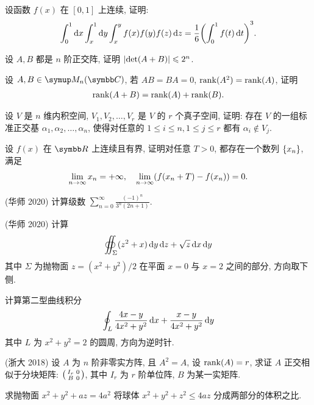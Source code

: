 \begin{exercise}[resume=exer]
      \item 设函数 $ f(x) $ 在 $ [0, 1] $ 上连续, 证明:
      \begin{align*}
          \int_{0}^{1} \dx*\int_{x}^{1} \dd{y}\int_{x}^{y}f(x)f(y)f(z)\dd{z} = \frac{1}{6}\qty(\int_{0}^{1}f(t) \dd{t})^{3}.
      \end{align*}
      \item 设 $ A, B $ 都是 $ n $ 阶正交阵, 证明 $ \abs{\det(A+B)} \leqslant 2^{n} $.
      \item 设 $ A, B \in \MM[\C] $, 若 $ AB = BA = 0 $, $ \rank(A^{2}) = \rank(A) $, 证明
      \begin{align*}
          \rank(A+B) = \rank(A) + \rank(B).
      \end{align*}
      \item 设 $ V $ 是 $ n $ 维内积空间,  $ V_{1}, V_{2}, \dots, V_{r} $ 是 $ V $ 的 $ r $ 个真子空间, 证明: 存在 $ V $ 的一组标准正交基 $ \alpha_{1}, \alpha_{2}, \dots, \alpha_{n} $, 使得对任意的 $ 1 \le i \le n, 1\le j \le r $ 都有 $ \alpha_{i} \notin V_{j} $.
      \item 设 $ f(x) $ 在 $ \R $ 上连续且有界, 证明对任意 $ T > 0 $, 都存在一个数列 $ \qty{x_{n}} $, 满足
      \begin{align*}
          \lim_{n \to \infty} x_{n} = +\infty, \quad \lim_{n \to \infty}(f(x_{n}+T) - f(x_{n})) = 0.
      \end{align*}
      \item (华师 2020) 计算级数 $ \sum_{n=0}^{\infty}\frac{(-1)^{n}}{3^{n}(2n+1)} $.
      \item (华师 2020) 计算
      \begin{align*}
          \oiint_{\Sigma} (z^{2}+x) \dd{y}\dd{z} + \sqrt{z} \dx*\dd{y}
      \end{align*}
      其中 $ \Sigma $ 为抛物面 $ z = (x^{2}+y^{2})/2 $ 在平面 $ x=0 $ 与 $ x=2 $ 之间的部分, 方向取下侧.
      \item 计算第二型曲线积分
      \begin{align*}
          \oint_{L} \frac{4x-y}{4x^{2}+y^{2}}\dx* + \frac{x-y}{4x^{2}+y^{2}}\dd{y}
      \end{align*}
      其中 $ L $ 为 $ x^{2} + y^{2} = 2 $ 的圆周, 方向为逆时针.
      \item (浙大 2018) 设 $ A $ 为 $ n $ 阶非零实方阵, 且 $ A^{2} = A $, 设 $ \rank(A) = r $, 求证 $ A $ 正交相似于分块矩阵: $ \smqty(I_{r} & 0 \\ B & 0) $, 其中 $ I_{r} $ 为 $ r $ 阶单位阵, $ B $ 为某一实矩阵.
      \item 求抛物面 $ x^{2} + y^{2} + az = 4a^{2} $ 将球体 $ x^{2} + y^{2} + z^{2} \le 4az $ 分成两部分的体积之比.

\end{exercise}
